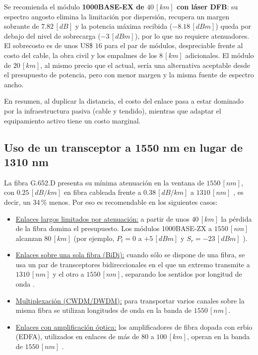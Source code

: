 Se recomienda el módulo \textbf{1000BASE-EX de $40 \, [km]$ con láser DFB}: su espectro angosto elimina la limitación por dispersión, recupera un margen sobrante de $7.82 \, [dB]$ y la potencia máxima recibida ($-8.18 \, [dBm]$) queda por debajo del nivel de sobrecarga ($-3 \, [dBm]$), por lo que no requiere atenuadores. El sobrecosto es de unos US\$ $16$ para el par de módulos, despreciable frente al costo del cable, la obra civil y los empalmes de los $8 \, [km]$ adicionales. El módulo de $20 \, [km]$, al mismo precio que el actual, sería una alternativa aceptable desde el presupuesto de potencia, pero con menor margen y la misma fuente de espectro ancho.

En resumen, al duplicar la distancia, el costo del enlace pasa a estar dominado por la infraestructura pasiva (cable y tendido), mientras que adaptar el equipamiento activo tiene un costo marginal.


\subsection{Uso de un transceptor a 1550 nm en lugar de 1310 nm}
\label{sec_5.2}
La fibra G.652.D presenta su mínima atenuación en la ventana de $1550 \, [nm]$, con $0.25 \, [dB/km]$ en fibra cableada frente a $0.38 \, [dB/km]$ a $1310 \, [nm]$ \cite{b3}, es decir, un 34\,\% menos. Por eso es recomendable en los siguientes casos:
\begin{itemize}
    \item \underline{Enlaces largos limitados por atenuación:} a partir de unos $40 \, [km]$ la pérdida de la fibra domina el presupuesto. Los módulos 1000BASE-ZX a $1550 \, [nm]$ alcanzan $80 \, [km]$ (por ejemplo, $P_{t} = 0$ a $+5 \, [dBm]$ y $S_{r} = -23 \, [dBm]$ \cite{b11}).
    \item \underline{Enlaces sobre una sola fibra (BiDi):} cuando sólo se dispone de una fibra, se usa un par de transceptores bidireccionales en el que un extremo transmite a $1310 \, [nm]$ y el otro a $1550 \, [nm]$, separando los sentidos por longitud de onda \cite{b7}.
    \item \underline{Multiplexación (CWDM/DWDM):} para transportar varios canales sobre la misma fibra se utilizan longitudes de onda en la banda de $1550 \, [nm]$.
    \item \underline{Enlaces con amplificación óptica:} los amplificadores de fibra dopada con erbio (EDFA), utilizados en enlaces de más de $80$ a $100 \, [km]$, operan en la banda de $1550 \, [nm]$ \cite{b7}.
\end{itemize}

